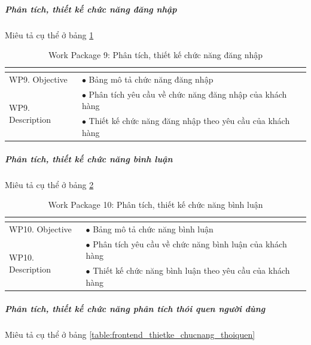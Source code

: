 \documentclass[a4paper]{book}
\begin{document}
\subparagraph{Phân tích, thiết kế chức năng đăng nhập} Miêu tả cụ thể ở bảng \ref{table:frontend_thietke_chucnang_dangnhap}
\begin{table}[h!]
	\begin{center}
		\begin{tabular}{|p{4cm}|p{10cm}|}
			\hline
			\multicolumn{2}{|c|}{\cellcolor[HTML]{363636}{\color[HTML]{FFFFFF}Work package 9: Phân tích, thiết kế chức năng đăng nhập}}\\
			\hline
			\multirow{1}{*}{WP9. Objective} & $\bullet$ Bảng mô tả chức năng đăng nhập\\
			\hline
			\multirow{2}{*}{WP9. Description} & $\bullet$ Phân tích yêu cầu về chức năng đăng nhập của khách hàng \\
			& $\bullet$ Thiết kế chức năng đăng nhập theo yêu cầu của khách hàng\\
			\hline
		\end{tabular}
		\caption{Work Package 9: Phân tích, thiết kế chức năng đăng nhập}
		\label{table:frontend_thietke_chucnang_dangnhap}
	\end{center}
\end{table}
\subparagraph{Phân tích, thiết kế chức năng bình luận} Miêu tả cụ thể ở bảng \ref{table:frontend_thietke_chucnang_binhluan}
\begin{table}[h!]
	\begin{center}
		\begin{tabular}{|p{4cm}|p{10cm}|}
			\hline
			\multicolumn{2}{|c|}{\cellcolor[HTML]{363636}{\color[HTML]{FFFFFF}Work package 10: Phân tích, thiết kế chức năng bình luận}}\\
			\hline
			\multirow{1}{*}{WP10. Objective} & $\bullet$ Bảng mô tả chức năng bình luận\\
			\hline
			\multirow{2}{*}{WP10. Description} & $\bullet$ Phân tích yêu cầu về chức năng bình luận của khách hàng \\
			& $\bullet$ Thiết kế chức năng bình luận theo yêu cầu của khách hàng\\
			\hline
		\end{tabular}
		\caption{Work Package 10: Phân tích, thiết kế chức năng bình luận}
		\label{table:frontend_thietke_chucnang_binhluan}
	\end{center}
\end{table}
\subparagraph{Phân tích, thiết kế chức năng phân tích thói quen người dùng} Miêu tả cụ thể ở bảng \ref{table:frontend_thietke_chucnang_thoiquen}
\end{document}

